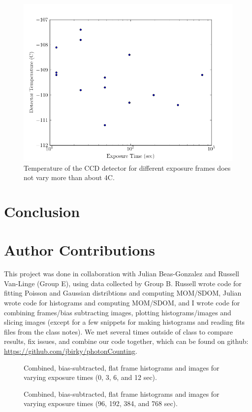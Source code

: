 \documentclass[preprint]{aastex62}
\begin{document}
\begin{figure}[H]
\begin{center}
\includegraphics[width=.48\linewidth]{plots/exposure_temp.png}
\caption{Temperature of the CCD detector for different exposure frames does not vary more than about 4C.} \label{fig:temp}
\end{center}
\end{figure}

\section{Conclusion}


\section{Author Contributions}

This project was done in collaboration with Julian Beas-Gonzalez and Russell Van-Linge (Group E), using data collected by Group B. Russell wrote code for fitting Poisson and Gaussian distribtions and computing MOM/SDOM, Julian wrote code for histograms and computing MOM/SDOM, and I wrote code for combining frames/bias subtracting images, plotting histograms/images and slicing images (except for a few snippets for making histograms and reading fits files from the class notes). We met several times outside of class to compare results, fix issues, and combine our code together, which can be found on github: \href{https://github.com/jbirky/photonCounting}{https://github.com/jbirky/photonCounting}.

\begin{figure}[H]
\caption{Combined, bias-subtracted, flat frame histograms and images for varying exposure times (0, 3, 6, and 12 sec). \label{fig:flats1}}
\end{figure}
\begin{figure}[H]
\caption{Combined, bias-subtracted, flat frame histograms and images for varying exposure times (96, 192, 384, and 768 sec). \label{fig:flats2}}
\end{figure}
\end{document}
